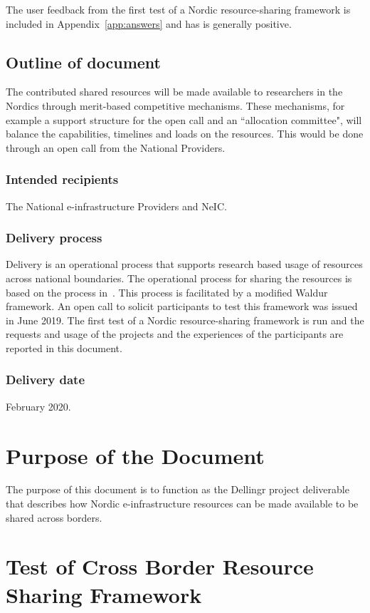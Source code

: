 \documentclass{article}
\newcommand{\dell}{Dellingr\xspace}
\newcommand{\einfra}{e-infrastructure\xspace}
\newcommand{\pilot}{first test of a Nordic resource-sharing framework\xspace}
\begin{document}
The user feedback from the \pilot is included in Appendix~\ref{app:answers} and has is generally positive.

\subsection{Outline of document}

The contributed shared resources will be made available to researchers in the Nordics through merit-based competitive mechanisms. These mechanisms, for example a support structure for the open call and an ``allocation committee", will balance the capabilities, timelines and loads on the resources. This would be done through an open call from the National Providers.

\subsubsection{Intended recipients}

The National \einfra Providers and NeIC. 

\subsubsection{Delivery process}

Delivery is an operational process that supports research based usage of resources across national boundaries. 
The operational process for sharing the resources is based on the process in~\cite{dellingr-p2-do5}.
This process is facilitated by a modified Waldur~\cite{waldur} framework.
An open call to solicit participants to test this framework was issued in June 2019.
The \pilot is run and the requests and usage of the projects and the experiences of the participants are reported in this document.
\subsubsection{Delivery date}

February 2020.

\section{Purpose of the Document}

The purpose of this document is to function as the \dell project deliverable that describes how Nordic \einfra resources
can be made available to be shared across borders.

\section{Test of Cross Border Resource Sharing Framework}
\end{document}
